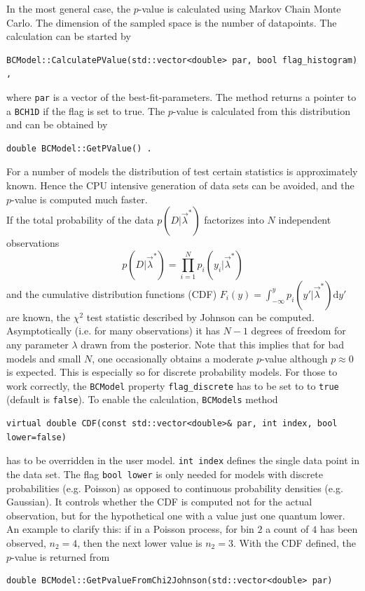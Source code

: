 \documentclass[11pt, a4paper]{article}
\begin{document}
\noindent
In the most general case, the $p$-value is calculated using Markov
Chain Monte Carlo. The dimension of the sampled space is the number
of datapoints. 
 The calculation can be started by
%
\begin{verbatim}
BCModel::CalculatePValue(std::vector<double> par, bool flag_histogram) ,
\end{verbatim}
%
\noindent
where \verb|par| is a vector of the best-fit-parameters. The method
returns a pointer to a \verb|BCH1D| if the flag is set to true. The
$p$-value is calculated from this distribution and can be obtained by
%
\begin{verbatim}
double BCModel::GetPValue() .
\end{verbatim}

\noindent
For a number of models the distribution of test certain statistics is
approximately known. Hence the CPU intensive generation of data sets
can be avoided, and the $p$-value is computed much faster. \\

\noindent 
If the total probability of the data $p\left(D|\vec{\lambda}^{*}\right)$
 factorizes into $N$ independent observations 
$$p\left(D|\vec{\lambda}^{*}\right) = \prod_{i=1}^N
p_i\left(y_i|\vec{\lambda}^{*}\right)$$ and the cumulative
distribution functions (CDF) $F_i(y)= \int_{-\infty}^{y}
p_i(y'|\vec{\lambda}^{*}) \mathrm{d }y'$ are known, the $\chi^2$ test
statistic described by Johnson \cite{Johnson_pValue} can be computed.
Asymptotically (i.e. for many observations) it has $N-1$ degrees of
freedom for any parameter $\lambda$ drawn from the posterior. Note
that this implies that for bad models and small $N$, one occasionally
obtains a moderate $p$-value although $p\approx 0 $ is expected. This
is especially so for discrete probability models. For those to work
correctly, the \texttt{BCModel} property \verb|flag_discrete| has to
be set to to \texttt{true} (default is \texttt{false}).  To enable the
calculation, \verb|BCModels| method
%
\begin{verbatim}
virtual double CDF(const std::vector<double>& par, int index, bool lower=false)
\end{verbatim}
%
has to be overridden in the user model.  \verb|int index| defines the
single data point in the data set. The flag \verb|bool lower| is only
needed for models with discrete probabilities (e.g. Poisson) as
opposed to continuous probability densities (e.g. Gaussian). It
controls whether the CDF is computed not for the actual observation,
but for the hypothetical one with a value just one quantum lower. An
example to clarify this: if in a Poisson process, for bin $2$ a count
of $4$ has been observed, $n_2=4$, then the next lower value is
$n_2=3$.  With the CDF defined, the $p$-value is returned from
\begin{verbatim}
double BCModel::GetPvalueFromChi2Johnson(std::vector<double> par)
\end{verbatim}
\end{document}
